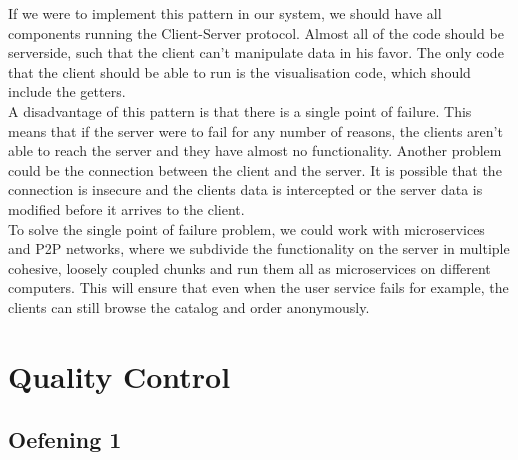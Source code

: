 \documentclass{article}
\begin{document}
If we were to implement this pattern in our system, we should have all components running the Client-Server protocol. Almost all of the code should be serverside, such that the client can't manipulate data in his favor. The only code that the client should be able to run is the visualisation code, which should include the getters. \\

A disadvantage of this pattern is that there is a single point of failure. This means that if the server were to fail for any number of reasons, the clients aren't able to reach the server and  they have almost no functionality. Another problem could be the connection between the client and the server. It is possible that the connection is insecure and the clients data is intercepted or the server data is modified before it arrives to the client. \\

To solve the single point of failure problem, we could work with microservices and P2P networks, where we subdivide the functionality on the server in multiple cohesive, loosely coupled chunks and run them all as microservices on different computers. This will ensure that even when the user service fails for example, the clients can still browse the catalog and order anonymously.\\

\section{Quality Control}

\subsection{Oefening 1}
\end{document}
